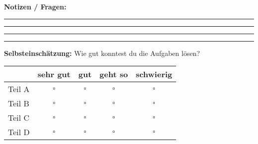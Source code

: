 % 


\ifdefined\zusatzinfo
\vspace{0.5cm}
\begin{center}
\zusatzinfo
\end{center}
\fi

\ifdefined\notizbereich
\vspace{1cm}
\noindent\textbf{Notizen / Fragen:}
\vspace{0.3cm}

\noindent\rule{\textwidth}{0.5pt}
\vspace{0.3cm}

\noindent\rule{\textwidth}{0.5pt}
\vspace{0.3cm}

\noindent\rule{\textwidth}{0.5pt}
\vspace{0.3cm}

\noindent\rule{\textwidth}{0.5pt}
\fi

\ifdefined\selbsteinschaetzung
\vspace{1cm}
\noindent\textbf{Selbsteinschätzung:} Wie gut konntest du die Aufgaben lösen?

\vspace{0.3cm}
\begin{center}
\begin{tabular}{|l|c|c|c|c|}
\hline
& sehr gut & gut & geht so & schwierig \\
\hline
Teil A & $\square$ & $\square$ & $\square$ & $\square$ \\
\hline
Teil B & $\square$ & $\square$ & $\square$ & $\square$ \\
\hline
Teil C & $\square$ & $\square$ & $\square$ & $\square$ \\
\hline
Teil D & $\square$ & $\square$ & $\square$ & $\square$ \\
\hline
\end{tabular}
\end{center}
\fi
